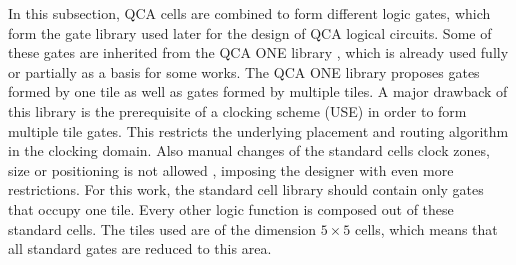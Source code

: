 In this subsection, QCA cells are combined to form different logic gates, which form the gate library used later for the design of QCA logical circuits. Some of these gates are inherited from the QCA ONE library \cite{QCA_scl}, which is already used fully \cite{peng2020spars} or partially \cite{ortho, greedy_tile} as a basis for some works.
The QCA ONE library proposes gates formed by one tile as well as gates formed by multiple tiles. A major drawback of this library is the prerequisite of a clocking scheme (USE) in order to form multiple tile gates. This restricts the underlying placement and routing algorithm in the clocking domain. Also manual changes of the standard cells clock zones, size or positioning is not allowed \cite{QCA_scl}, imposing the designer with even more restrictions. For this work, the standard cell library should contain only gates that occupy one tile. Every other logic function is composed out of these standard cells. The tiles used are of the dimension $5 \times 5$ cells, which means that all standard gates are reduced to this area.\\
